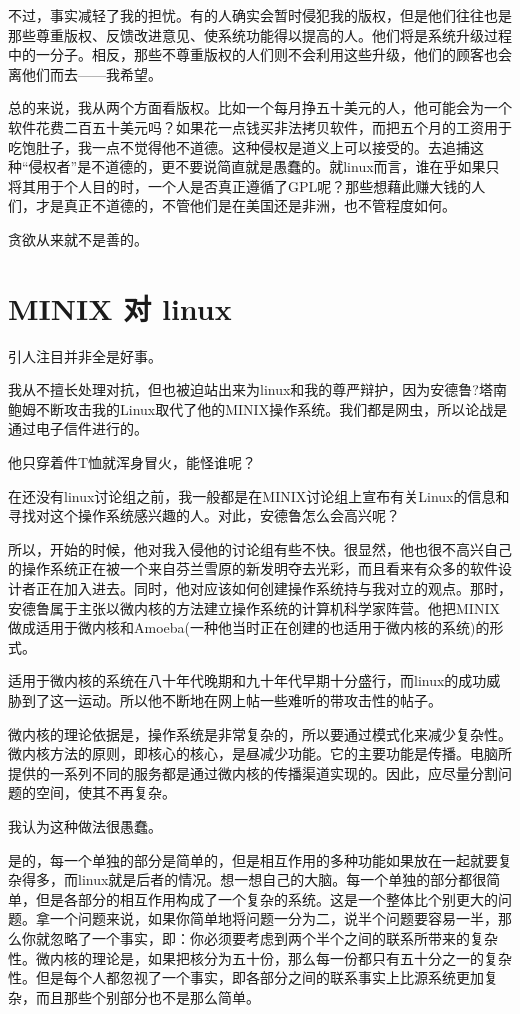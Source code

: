 不过，事实减轻了我的担忧。有的人确实会暂时侵犯我的版权，但是他们往往也是那些尊重版权、反馈改进意见、使系统功能得以提高的人。他们将是系统升级过程中的一分子。相反，那些不尊重版权的人们则不会利用这些升级，他们的顾客也会离他们而去——我希望。

总的来说，我从两个方面看版权。比如一个每月挣五十美元的人，他可能会为一个软件花费二百五十美元吗？如果花一点钱买非法拷贝软件，而把五个月的工资用于吃饱肚子，我一点不觉得他不道德。这种侵权是道义上可以接受的。去追捕这种“侵权者”是不道德的，更不要说简直就是愚蠢的。就linux而言，谁在乎如果只将其用于个人目的时，一个人是否真正遵循了GPL呢？那些想藉此赚大钱的人们，才是真正不道德的，不管他们是在美国还是非洲，也不管程度如何。

贪欲从来就不是善的。

 
\section{MINIX 对 linux}

引人注目并非全是好事。

我从不擅长处理对抗，但也被迫站出来为linux和我的尊严辩护，因为安德鲁?塔南鲍姆不断攻击我的Linux取代了他的MINIX操作系统。我们都是网虫，所以论战是通过电子信件进行的。

他只穿着件T恤就浑身冒火，能怪谁呢？

在还没有linux讨论组之前，我一般都是在MINIX讨论组上宣布有关Linux的信息和寻找对这个操作系统感兴趣的人。对此，安德鲁怎么会高兴呢？

所以，开始的时候，他对我入侵他的讨论组有些不快。很显然，他也很不高兴自己的操作系统正在被一个来自芬兰雪原的新发明夺去光彩，而且看来有众多的软件设计者正在加入进去。同时，他对应该如何创建操作系统持与我对立的观点。那时，安德鲁属于主张以微内核的方法建立操作系统的计算机科学家阵营。他把MINIX做成适用于微内核和Amoeba(一种他当时正在创建的也适用于微内核的系统)的形式。

适用于微内核的系统在八十年代晚期和九十年代早期十分盛行，而linux的成功威胁到了这一运动。所以他不断地在网上帖一些难听的带攻击性的帖子。

微内核的理论依据是，操作系统是非常复杂的，所以要通过模式化来减少复杂性。微内核方法的原则，即核心的核心，是昼减少功能。它的主要功能是传播。电脑所提供的一系列不同的服务都是通过微内核的传播渠道实现的。因此，应尽量分割问题的空间，使其不再复杂。

我认为这种做法很愚蠢。

是的，每一个单独的部分是简单的，但是相互作用的多种功能如果放在一起就要复杂得多，而linux就是后者的情况。想一想自己的大脑。每一个单独的部分都很简单，但是各部分的相互作用构成了一个复杂的系统。这是一个整体比个别更大的问题。拿一个问题来说，如果你简单地将问题一分为二，说半个问题要容易一半，那么你就忽略了一个事实，即：你必须要考虑到两个半个之间的联系所带来的复杂性。微内核的理论是，如果把核分为五十份，那么每一份都只有五十分之一的复杂性。但是每个人都忽视了一个事实，即各部分之间的联系事实上比源系统更加复杂，而且那些个别部分也不是那么简单。

